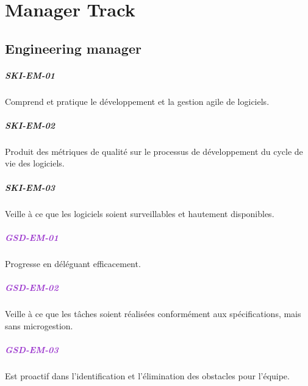 \documentclass[a4paper, french, openany, 12pt]{book}
\newcommand\dex[1]{\textcolor{BrickRed}{\textbf{\uppercase{ski-{#1}}}}}
\newcommand\str[1]{\textcolor{DarkOrchid}{\textbf{\uppercase{gsd-{#1}}}}}
\begin{document}
\part{Manager Track}

\chapter{Engineering manager}

\begin{multicols}{2}

  \subsubsection*{\dex{em-01}}

  Comprend et pratique le développement et la gestion agile de logiciels.

  \subsubsection*{\dex{em-02}}

  Produit des métriques de qualité sur le processus de développement du cycle de vie des logiciels.
  
  \subsubsection*{\dex{em-03}}

  Veille à ce que les logiciels soient surveillables et hautement disponibles.

  \subsubsection*{\str{em-01}}

  Progresse en déléguant efficacement.
  
  \subsubsection*{\str{em-02}}

  Veille à ce que les tâches soient réalisées conformément aux spécifications, mais sans microgestion.

  \subsubsection*{\str{em-03}}

  Est proactif dans l'identification et l'élimination des obstacles pour l'équipe.


\end{multicols}
\end{document}
